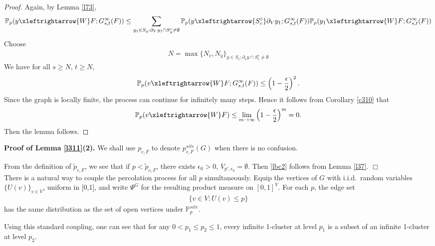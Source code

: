 \documentclass[11pt]{amsart}
\theoremstyle{plain}
\numberwithin{equation}{section}
\numberwithin{figure}{section}
\begin{document}
\begin{proof}
Again, by Lemma \ref{l73},
\begin{align*}
    \mathbb{P}_{p}(y\xleftrightarrow{W} F;G_{s,t}^{\infty}(F))\leq \sum_{y_1\in S_y:\partial_V y_1\cap S_y^{c}\neq \emptyset}\mathbb{P}_{p}(y\xleftrightarrow{S_v^{\circ}}\partial_V y_1;G_{s,t}^{\infty}(F))\mathbb{P}_{p}(y_1\xleftrightarrow{W} F;G_{s,t}^{\infty}(F))
\end{align*}
Choose 
\begin{align*}
N=\max\{N_v,N_y\}_{y\in S_v:\partial_{v}y\cap S_v^c\neq\emptyset}
\end{align*}
We have for all $s\geq N$, $t\geq N$, 
\begin{align*}
    \mathbb{P}_{p}(v\xleftrightarrow{W} F;G_{s,t}^{\infty}(F))\leq \left(1-\frac{\epsilon}{2}\right)^2.
\end{align*}
Since the graph is locally finite, the process can continue for infinitely many steps. Hence it follows from Corollary \ref{c310} that
\begin{align*}
    \mathbb{P}_{p}(v\xleftrightarrow{W} F)\leq\lim_{m\rightarrow\infty}\left(1-\frac{\epsilon}{2}\right)^m=0.
\end{align*}
Then the lemma follows.
\end{proof}

\bigskip
\noindent\textbf{Proof of Lemma \ref{l311}(2).} We shall use $p_{c,F}$ to denote $p_{c,F}^{site}(G)$ when there is no confusion. 

From the definition of $\tilde{p}_{c,F}$, we see that if $p<\tilde{p}_{c,F}$, there exists $\epsilon_0>0$, $V_{p',\epsilon_0}=\emptyset$. Then \ref{lbc2} follows from Lemma \ref{l37}.
\hfill$\Box$
\\



There is a natural way to couple the percolation process for all $p$ simultaneously. Equip the vertices of $G$ with i.i.d.~random variables $\{U(v)\}_{v\in V}$, uniform in [0,1], and write $\Psi^G$ for the resulting product measure on $[0,1]^V$. For each $p$, the edge set 
\begin{align*}
\{v\in V: U(v)\leq p\}
\end{align*}
has the same distribution as the set of open vertices under $\mathbb{P}_p^{site}$.

Using this standard coupling, one can see that for any $0<p_1\leq p_2\leq 1$, every infinite 1-cluster at level $p_1$ is a subset of an infinite 1-cluster at level $p_2$.
\end{document}
